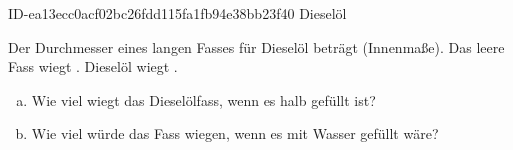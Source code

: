 \begin{exercise}
      {ID-ea13ecc0acf02bc26fdd115fa1fb94e38bb23f40}
      {Dieselöl}
  \ifproblem\problem\par
    Der Durchmesser eines  langen Fasses für Dieselöl
    beträgt  (Innenmaße). Das leere Fass wiegt .
     Dieselöl wiegt .
    \begin{enumerate}[a)]
      \item Wie viel wiegt das Dieselölfass, wenn es halb gefüllt ist?
      \item Wie viel würde das Fass wiegen, wenn es mit Wasser gefüllt wäre?
    \end{enumerate}
  \fi
\end{exercise}
